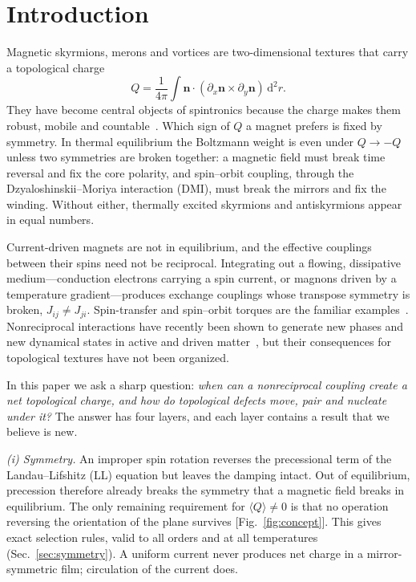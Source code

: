\documentclass[aps,prb,twocolumn,superscriptaddress,longbibliography,floatfix]{revtex4-2}
\newcommand{\dd}{\mathrm d}
\newcommand{\avg}[1]{\langle #1\rangle}
\begin{document}
\section{Introduction}

Magnetic skyrmions, merons and vortices are two-dimensional textures that carry a topological charge
\begin{equation}
Q=\frac{1}{4\pi}\int \mathbf n\cdot(\partial_x\mathbf n\times\partial_y\mathbf n)\,\dd^2r .
\label{eq:Q}
\end{equation}
They have become central objects of spintronics because the charge makes them robust, mobile and countable~\cite{BelavinPolyakov1975,Muhlbauer2009,NagaosaTokura2013,Fert2017}. Which sign of $Q$ a magnet prefers is fixed by symmetry. In thermal equilibrium the Boltzmann weight is even under $Q\to-Q$ unless two symmetries are broken together: a magnetic field must break time reversal and fix the core polarity, and spin--orbit coupling, through the Dzyaloshinskii--Moriya interaction (DMI), must break the mirrors and fix the winding. Without either, thermally excited skyrmions and antiskyrmions appear in equal numbers.

Current-driven magnets are not in equilibrium, and the effective couplings between their spins need not be reciprocal. Integrating out a flowing, dissipative medium---conduction electrons carrying a spin current, or magnons driven by a temperature gradient---produces exchange couplings whose transpose symmetry is broken, $J_{ij}\neq J_{ji}$. Spin-transfer and spin--orbit torques are the familiar examples~\cite{ZhangLi2004,Thiaville2005}. Nonreciprocal interactions have recently been shown to generate new phases and new dynamical states in active and driven matter~\cite{Fruchart2021,Hanai2024,Das2002}, but their consequences for topological textures have not been organized.

In this paper we ask a sharp question: \emph{when can a nonreciprocal coupling create a net topological charge, and how do topological defects move, pair and nucleate under it?} The answer has four layers, and each layer contains a result that we believe is new.

\emph{(i) Symmetry.} An improper spin rotation reverses the precessional term of the Landau--Lifshitz (LL) equation but leaves the damping intact. Out of equilibrium, precession therefore already breaks the symmetry that a magnetic field breaks in equilibrium. The only remaining requirement for $\avg{Q}\neq0$ is that no operation reversing the orientation of the plane survives [Fig.~\ref{fig:concept}]. This gives exact selection rules, valid to all orders and at all temperatures (Sec.~\ref{sec:symmetry}). A uniform current never produces net charge in a mirror-symmetric film; circulation of the current does.
\end{document}
